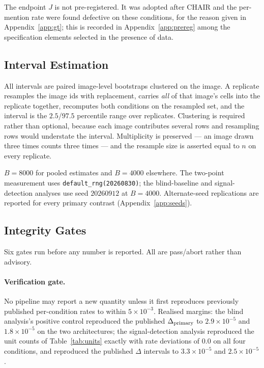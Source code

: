 The endpoint $J$ is not pre-registered. It was adopted after CHAIR and the per-mention rate were found
defective on these conditions, for the reason given in Appendix~\ref{app:gt}; this is recorded in
Appendix~\ref{app:prereg} among the specification elements selected in the presence of data.

\subsection{Interval Estimation}
\label{app:boot}

All intervals are paired image-level bootstraps clustered on the image. A replicate resamples the
image ids with replacement, carries \emph{all} of that image's cells into the replicate together,
recomputes both conditions on the resampled set, and the interval is the $2.5$/$97.5$ percentile
range over replicates. Clustering is required rather than optional, because each image contributes
several rows and resampling rows would understate the interval. Multiplicity is preserved --- an
image drawn three times counts three times --- and the resample size is asserted equal to $n$ on
every replicate.

$B = 8000$ for pooled estimates and $B = 4000$ elsewhere. The two-point measurement uses
\texttt{default\_rng(20260830)}; the blind-baseline and signal-detection analyses use seed $20260912$ at
$B = 4000$. Alternate-seed replications are reported for every primary contrast
(Appendix~\ref{app:seeds}).

\subsection{Integrity Gates}
\label{app:gates}

Six gates run before any number is reported. All are pass/abort rather than advisory.

\paragraph{Verification gate.} No pipeline may report a new quantity unless it first reproduces
previously published per-condition rates to within $5\times10^{-3}$. Realised margins: the blind
analysis's positive control reproduced the published $\Delta_{\mathrm{primary}}$ to $2.9\times10^{-5}$ and
$1.8\times10^{-5}$ on the two architectures; the signal-detection analysis reproduced the unit counts of
Table~\ref{tab:units} exactly with rate deviations of $0.0$ on all four conditions, and reproduced
the published $\Delta$ intervals to $3.3\times10^{-5}$ and $2.5\times10^{-5}$.

